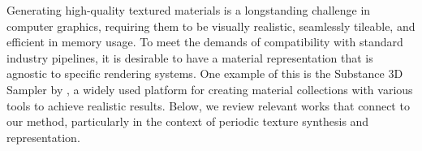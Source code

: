 


Generating high-quality textured materials is a longstanding challenge in computer graphics, requiring them to be visually realistic, seamlessly tileable, and efficient in memory usage. To meet the demands of compatibility with standard industry pipelines, it is desirable to have a material representation that is agnostic to specific rendering systems. One example of this is the Substance 3D Sampler by \citet{substance_sampler}, a widely used platform for creating material collections with various tools to achieve realistic results. Below, we review relevant works that connect to our method, particularly in the context of periodic texture synthesis and representation.



